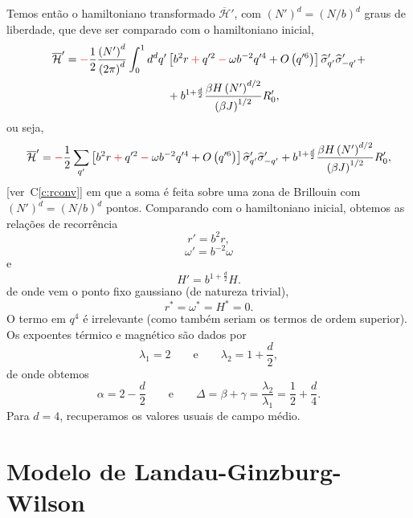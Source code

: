 \documentclass[12pt,a4paper]{article}
\newcommand{\Hb}{\overline{\mathcal{H}}}
\newcommand{\sh}{\widehat{\sigma}}
\newcommand{\corr}[1]{\textcolor{red}{#1}}
\newcommand{\cmais}{\mathbin{\textcolor{red}{+}}}
\newcommand{\cmenos}{\mathbin{\textcolor{red}{-}}}
\newcounter{corr}
\newcommand{\ver}[1]{{\color{red}\small[ver~C\ref{#1}]}}
\begin{document}
Temos então o hamiltoniano transformado $\Hb'$, com $\left(N'\right)^d=\left(N/b\right)^d$ graus
de liberdade, que deve ser comparado com o hamiltoniano inicial,
\begin{equation}
\begin{split}
\Hb'=\corr{-}\frac12\frac{\left(N'\right)^d}{\left(2\pi\right)^d}\int_0^1d^dq'&\left[b^2r\cmais q'^2\cmenos\omega b^{-2}q'^4+O\left(q'^6\right)\right]\sh'_{q'}\sh'_{-q'}+\\
&+b^{1+\frac d2}\frac{\beta H\left(N'\right)^{d/2}}{\left(\beta J\right)^{1/2}}R'_0,
\end{split}
\end{equation}
ou seja,
\begin{equation}
\Hb'=\corr{-}\frac12\sum_{q'}\left[b^2r\cmais q'^2\cmenos\omega b^{-2}q'^4+O\left(q'^6\right)\right]\sh'_{q'}\sh'_{-q'}
+b^{1+\frac d2}\frac{\beta H\left(N'\right)^{d/2}}{\left(\beta J\right)^{1/2}}R'_0,
\end{equation}
\ver{c:rconv}
em que a soma é feita sobre uma zona de Brillouin com $\left(N'\right)^d=\left(N/b\right)^d$
pontos. Comparando com o hamiltoniano inicial, obtemos as relações de
recorrência
\begin{equation}
r'=b^2r,
\end{equation}
\begin{equation}
\omega'=b^{-2}\omega
\end{equation}
e
\begin{equation}
H'=b^{1+\frac d2}H.
\end{equation}
de onde vem o ponto fixo gaussiano (de natureza trivial),
\begin{equation}
r^*=\omega^*=H^*=0.
\end{equation}
O termo em $q^4$ é irrelevante (como também seriam os termos de ordem
superior). Os expoentes térmico e magnético são dados por
\begin{equation}
\lambda_1=2\qquad\text{e}\qquad\lambda_2=1+\frac d2,
\end{equation}
de onde obtemos
\begin{equation}
\alpha=2-\frac d2\qquad\text{e}\qquad\Delta=\beta+\gamma=\frac{\lambda_2}{\lambda_1}=\frac12+\frac d4.
\end{equation}
Para $d=4$, recuperamos os valores usuais de campo médio.

\section{Modelo de Landau-Ginzburg-Wilson}
\end{document}
